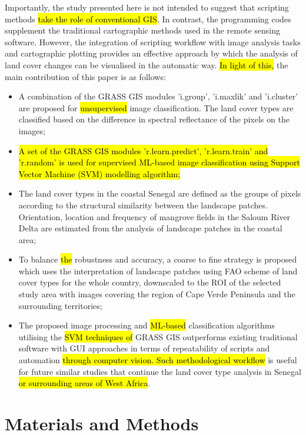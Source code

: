 \documentclass[earth,article,submit,pdftex,moreauthors]{Definitions/mdpi}
\begin{document}
Importantly, the study presented here is not intended to suggest that scripting methods \hl{take the role of conventional GIS}. In contrast, the programming codes\hl{ }supplement the traditional cartographic methods used in the remote sensing software. However, the integration of scripting workflow with image analysis tasks and cartographic plotting provides an effective approach by which the analysis of land cover changes can be visualised in the automatic way. \hl{In light of this, }the main contribution of this paper is as follows: 

\begin{itemize}
  \item A combination of the GRASS GIS modules 'i.group', 'i.maxlik' and 'i.cluster' are proposed for \hl{unsupervised }image classification. The land cover types are classified based on the difference in spectral reflectance of the pixels on the images;
  \item \hl{A set of the GRASS GIS modules 'r.learn.predict', 'r.learn.train' and 'r.random' is used for supervised ML-based image classification using Support Vector Machine (SVM) modelling algorithm;}
  \item The land cover types in the coastal Senegal are defined as the groups of pixels according to the structural similarity between the landscape patches. Orientation, location and frequency of mangrove fields in the Saloum River Delta are estimated from the analysis of landscape patches in the coastal area;
  \item To balance \hl{the} robustness and accuracy, a coarse to fine strategy is proposed which uses the interpretation of landscape patches using FAO scheme of land cover types for the whole country, downscaled to the ROI of the selected study area with images covering the region of Cape Verde Peninsula and the surrounding territories;
  \item The proposed image processing and \hl{ML-based }classification algorithms utilising the \hl{SVM techniques of }GRASS GIS outperforms existing traditional software with GUI approaches in terms of repeatability of scripts and automation \hl{through computer vision. Such methodological workflow }is useful for future similar studies that continue the land cover type analysis in Senegal \hl{or surrounding areas of West Africa}.
\end{itemize}

\section{Materials and Methods}
\end{document}
